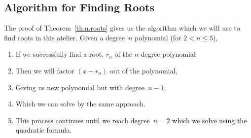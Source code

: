 \subsection{Algorithm for Finding Roots}

The proof of Theorem~\ref{th.n.roots} gives us the algorithm which we will use to find
roots in this atelier.  Given a degree~$n$ polynomial (for $2<n\leq5$),
\begin{enumerate}
\item If we successfully find a root, $r_n$ of the $n$-degree polynomial
\item Then we will factor  $(x-r_n)$ out of the polynomial,
\item Giving us new polynomial but with degree~$n-1$,
\item Which we can solve by the same approach.  
\item This process continues until we reach degree~$n=2$ which we
  solve using the quadratic formula.

\end{enumerate}


